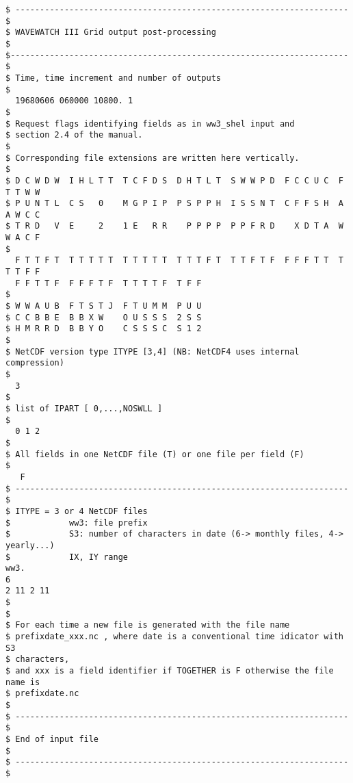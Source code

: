 \begin{verbatim}
$ -------------------------------------------------------------------- $
$ WAVEWATCH III Grid output post-processing                            $
$--------------------------------------------------------------------- $
$ Time, time increment and number of outputs
$
  19680606 060000 10800. 1
$
$ Request flags identifying fields as in ww3_shel input and
$ section 2.4 of the manual.
$
$ Corresponding file extensions are written here vertically.  
$
$ D C W D W  I H L T T  T C F D S  D H T L T  S W W P D  F C C U C  F T T W W  
$ P U N T L  C S   0    M G P I P  P S P P H  I S S N T  C F F S H  A A W C C  
$ T R D   V  E     2    1 E   R R    P P P P  P P F R D    X D T A  W W A C F 
$
  F T T F T  T T T T T  T T T T T  T T T F T  T T F T F  F F F T T  T T T F F  
  F F T T F  F F F T F  T T T T F  T F F 
$
$ W W A U B  F T S T J  F T U M M  P U U
$ C C B B E  B B X W    O U S S S  2 S S
$ H M R R D  B B Y O    C S S S C  S 1 2
$
$ NetCDF version type ITYPE [3,4] (NB: NetCDF4 uses internal compression)
$
  3
$
$ list of IPART [ 0,...,NOSWLL ]
$
  0 1 2 
$
$ All fields in one NetCDF file (T) or one file per field (F) 
$
   F
$ -------------------------------------------------------------------- $
$ ITYPE = 3 or 4 NetCDF files
$            ww3: file prefix
$            S3: number of characters in date (6-> monthly files, 4-> yearly...)
$            IX, IY range
ww3.
6
2 11 2 11 
$
$
$ For each time a new file is generated with the file name
$ prefixdate_xxx.nc , where date is a conventional time idicator with S3
$ characters,
$ and xxx is a field identifier if TOGETHER is F otherwise the file name is 
$ prefixdate.nc 
$
$ -------------------------------------------------------------------- $
$ End of input file                                                    $
$ -------------------------------------------------------------------- $
\end{verbatim}
